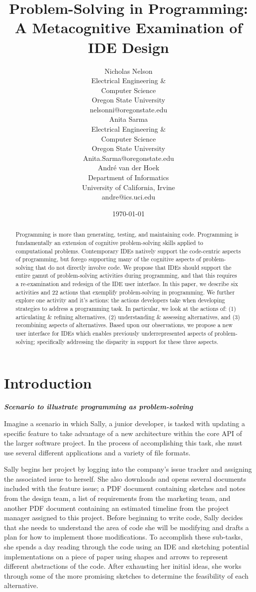 \documentclass{ppig}
\title{Problem-Solving in Programming: A Metacognitive Examination of IDE Design}
\author{Nicholas Nelson \\
  Electrical Engineering \&\\ Computer Science \\
  Oregon State University \\
  nelsonni@oregonstate.edu \\
  \And
  Anita Sarma \\
  Electrical Engineering \&\\ Computer Science \\
  Oregon State University \\
  Anita.Sarma@oregonstate.edu \\
  \And
  André van der Hoek \\
  Department of Informatics \\
  University of California, Irvine \\
  andre@ics.uci.edu
}
\date{\today}
\newcommand{\bold}[1]{\textit{\textbf{\color{aoblue}#1}}} %
\begin{document}
\maketitle
\thispagestyle{empty}

\begin{abstract}

Programming is more than generating, testing, and maintaining code.
Programming is fundamentally an extension of cognitive problem-solving skills applied to computational problems.
Contemporary IDEs natively support the code-centric aspects of programming, but forego supporting many of the cognitive aspects of problem-solving that do not directly involve code.
We propose that IDEs should support the entire gamut of problem-solving activities during programming, and that this requires a re-examination and redesign of the IDE user interface.
In this paper, we describe six activities and 22 actions that exemplify problem-solving in programming.
We further explore one activity and it's actions: the actions developers take when developing strategies to address a programming task.
In particular, we look at the actions of: (1) articulating \& refining alternatives, (2) understanding \& assessing alternatives, and (3) recombining aspects of alternatives.
Based upon our observations, we propose a new user interface for IDEs which enables previously underrepresented aspects of problem-solving; specifically addressing the disparity in support for these three aspects. 
\end{abstract}

\section{Introduction}
\bold{Scenario to illustrate programming as problem-solving}\vspace*{-0.4\baselineskip}

Imagine a scenario in which Sally, a junior developer, is tasked with updating a specific feature to take advantage of a new architecture within the core API of the larger software project. In the process of accomplishing this task, she must use several different applications and a variety of file formats.

Sally begins her project by logging into the company's issue tracker and assigning the associated issue to herself.
She also downloads and opens several documents included with the feature issue; a PDF document containing sketches and notes from the design team, a list of requirements from the marketing team, and another PDF document containing an estimated timeline from the project manager assigned to this project.
Before beginning to write code, Sally decides that she needs to understand the area of code she will be modifying and drafts a plan for how to implement those modifications.
To accomplish these sub-tasks, she spends a day reading through the code using an IDE and sketching potential implementations on a piece of paper using shapes and arrows to represent different abstractions of the code.
After exhausting her initial ideas, she works through some of the more promising sketches to determine the feasibility of each alternative.
\end{document}
